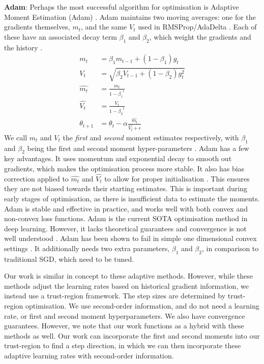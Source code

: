 \textbf{Adam}: Perhaps the most successful algorithm for optimisation is Adaptive Moment Estimation (Adam) \citep{kingma2014adam}. Adam maintains two moving averages: one for the gradients themselves, $m_t$, and the same $V_t$ used in RMSProp/AdaDelta \citep{kingma2014adam}. Each of these have an associated decay term $\beta_1$ and $\beta_2$, which weight the gradients and the history \citep{kingma2014adam}.
\begin{align}
m_t &= \beta_1 m_{t-1} + (1 - \beta_1) g_t \label{eq:m_t} \\
V_t &= \sqrt{\beta_2 V_{t-1} + (1 - \beta_2) g_t^2} \\
\hat{m_t} &= \frac{m_t}{1 - {\beta_1}^t} \\
\hat{V_t} &= \frac{V_t}{1 - {\beta_2}^t} \\
\theta_{t+1} &= \theta_t - \alpha \frac{\hat{m_t}}{{\hat{V_t}} + \epsilon} \label{eq:adam_update}
\end{align}
We call $m_t$ and $V_t$ the \textit{first} and \textit{second} moment estimates respectively, with $\beta_1$ and $\beta_2$ being the first and second moment hyper-parameters \citep{kingma2014adam}. Adam has a few key advantages. It uses momentum and exponential decay to smooth out gradients, which makes the optimisation process more stable. It also has bias correction applied to $\hat{m_t}$ and $\hat{V_t}$ to allow for proper initialisation \citep{kingma2014adam}. This ensures they are not biased towards their starting estimates. This is important during early stages of optimisation, as there is insufficient data to estimate the moments. Adam is stable and effective in practice, and works well with both convex and non-convex loss functions. Adam is the current SOTA optimisation method in deep learning. However, it lacks theoretical guarantees and convergence is not well understood \citep{reddi2019asmgrad}. Adam has been shown to fail in simple one dimensional convex settings \citep{reddi2019asmgrad}. It additionally needs two extra parameters, $\beta_1$ and $\beta_2$, in comparison to traditional SGD, which need to be tuned.

Our work is similar in concept to these adaptive methods. However, while these methods adjust the learning rates based on historical gradient information, we instead use a trust-region framework. The step sizes are determined by trust-region optimisation. We use second-order information, and do not need a learning rate, or first and second moment hyperparameters. We also have convergence guarantees. However, we note that our work functions as a hybrid with these methods as well. Our work can incorporate the first and second moments into our trust-region to find a step direction, in which we can then incorporate these adaptive learning rates with second-order information. 


